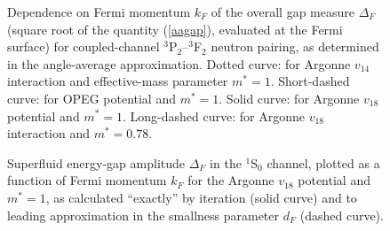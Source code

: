 \begin{figure}
\begin{center}
\end{center}
\caption{
Dependence on Fermi momentum $k_F$ of the overall gap measure 
$\Delta_F$ (square root of the quantity (\ref{aagap}), evaluated 
at the Fermi surface) for coupled-channel $^3$P$_2$--$^3$F$_2$ 
neutron pairing, as determined in the angle-average approximation.  
Dotted curve: for Argonne $v_{14}$ interaction and effective-mass 
parameter $m^*=1$.  Short-dashed curve:  for OPEG potential and 
$m^*=1$.  Solid curve: for Argonne $v_{18}$ potential and 
$m^*=1$.  Long-dashed curve: for Argonne $v_{18}$ interaction and 
$m^*=0.78$.  
}
\label{fig:opegandv18coupled}
\end{figure}

\begin{figure}
\begin{center}
\end{center}
\caption{
Superfluid energy-gap amplitude $\Delta_F$ in the $^1$S$_0$
channel, plotted as a function of Fermi momentum $k_F$ for the
Argonne $v_{18}$ potential and $m^*=1$, as calculated ``exactly''
by iteration (solid curve) and to leading approximation in
the smallness parameter $d_F$ (dashed curve).
}
\label{fig:spapprox}
\end{figure}

